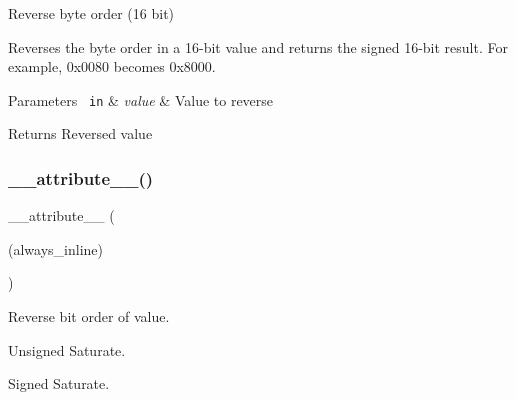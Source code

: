 Reverse byte order (16 bit) 

Reverses the byte order in a 16-\/bit value and returns the signed 16-\/bit result. For example, 0x0080 becomes 0x8000. 
\begin{DoxyParams}[1]{Parameters}
\mbox{\texttt{ in}}  & {\em value} & Value to reverse \\
\hline
\end{DoxyParams}
\begin{DoxyReturn}{Returns}
Reversed value 
\end{DoxyReturn}
\mbox{\label{group___c_m_s_i_s___core___instruction_interface_gab926fe7178a379c3a7c0410b06fcb661}} 
\subsubsection{\texorpdfstring{\_\_attribute\_\_()}{\_\_attribute\_\_()}\hspace{0.1cm}{\footnotesize\ttfamily [3/3]}}
{\footnotesize\ttfamily \+\_\+\+\_\+attribute\+\_\+\+\_\+ (\begin{DoxyParamCaption}\item[{(always\+\_\+inline)}]{ }\end{DoxyParamCaption})}



Reverse bit order of value. 

Unsigned Saturate.

Signed Saturate.

